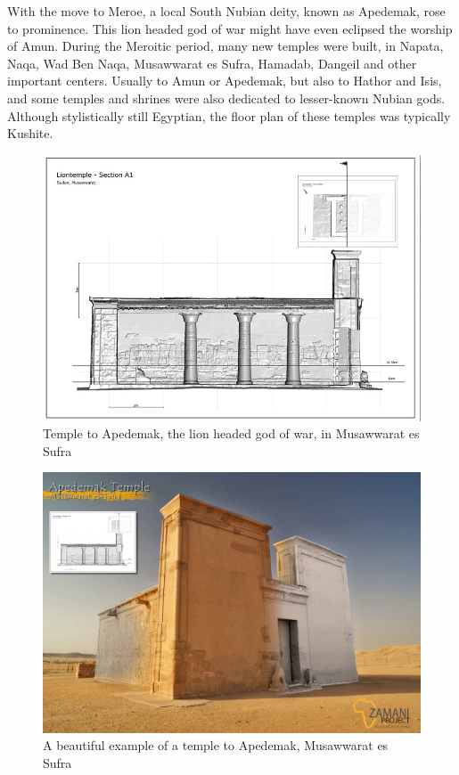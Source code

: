 \documentclass[a4paper,12pt]{scrreprt}
\begin{document}
With the move to Meroe, a local South Nubian deity, known as Apedemak, rose to prominence. This lion headed god of war might have even eclipsed the worship of Amun. During the Meroitic period, many new temples were built, in Napata, Naqa, Wad Ben Naqa, Musawwarat es Sufra, Hamadab, Dangeil and other important centers. Usually to Amun or Apedemak, but also to Hathor and Isis, and some temples and shrines were also dedicated to lesser-known Nubian gods. Although stylistically still Egyptian, the floor plan of these temples was typically Kushite.

\begin{figure}[H]
	\centering
	\includegraphics[width=\textwidth]{img/temple/apedemak_temple_profile}
	\caption{Temple to Apedemak, the lion headed god of war, in Musawwarat es Sufra}
\end{figure}

\begin{figure}[H]
	\centering
	\includegraphics[width=\textwidth]{img/temple/apedemak_temple}
	\caption{A beautiful example of a temple to Apedemak, Musawwarat es Sufra}
\end{figure}
\end{document}
